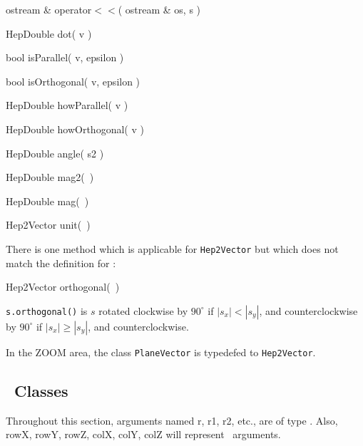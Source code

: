 \begin{shortlist}
  \item ostream \& operator$<<$( ostream \& os, s )
\end{shortlist}
\begin{shortlist}
  \item HepDouble dot( v ) \see{\ref{eq:dot}}
  \item bool isParallel( v, epsilon ) \see{\ref{eq:isPar}}
  \item bool isOrthogonal( v, epsilon ) \see{\ref{eq:isOrtho}}
  \item HepDouble howParallel( v ) \see{\ref{eq:howPar}, \ref{eq:howPar:2}}
  \item HepDouble howOrthogonal( v ) \see{\ref{eq:howOrtho}, \ref{eq:howOrtho:2}}
  \item HepDouble angle( s2 ) \see{\ref{eq:angle}}
\end{shortlist}

\begin{shortlist}
  \item HepDouble mag2(~) \see{\ref{eq:mag2}}
  \item HepDouble mag(~) \see{\ref{eq:mag}, \ref{eq:mag:2}}
  \item Hep2Vector unit(~) \see{\ref{eq:svunit}}
\end{shortlist}

\noindent
There is one method which is applicable for {\tt Hep2Vector} but which 
does not match the definition for \SV:

\begin{shortlist}
  \item Hep2Vector orthogonal(~) 
\end{shortlist}

\noindent
\verb$s.orthogonal()$ is $s$ rotated clockwise by $90^\circ$ if 
$|s_x| < |s_y|$, and counterclockwise by $90^\circ$ if 
$|s_x| \geq |s_y|$, and counterclockwise.

\vspace{.16 in}

In the ZOOM area, the class {\tt PlaneVector} is typedefed to 
{\tt Hep2Vector}.

                                   
\subsection{\protect\Ro\ Classes}

Throughout this section, arguments named r, r1, r2, etc., are of type \Ro.
Also, rowX, rowY, rowZ, colX, colY, colZ will represent \SV\ arguments.

